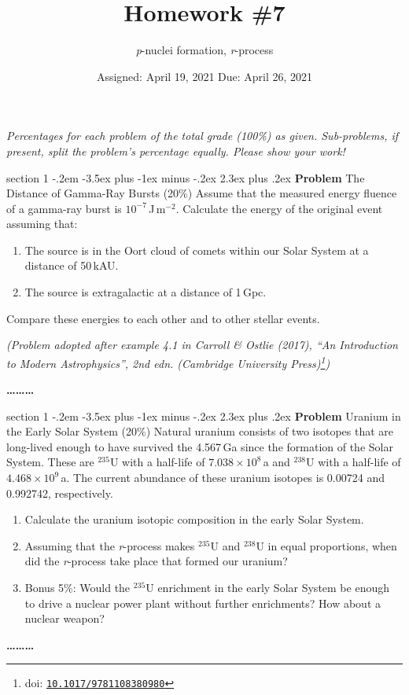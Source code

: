 \documentclass[letterpaper,12pt,twoside=false,DIV=11]{scrartcl}
\makeatletter
\newcommand{\topic}{\author}
\newenvironment{problem}{\@startsection
    {section}
    {1}
    {-.2em}
    {-3.5ex plus -1ex minus -.2ex}
    {2.3ex plus .2ex}
    {
        \pagebreak[3] %
        \noindent\sffamily\bfseries Problem
    }
}
{
    \begin{center}\large\bfseries\ldots\ldots\ldots\end{center}
}
\providecommand{\ex}[1]{\ensuremath{^{#1}}}
\makeatother
\begin{document}
\title{Homework \#7}
\topic{\textit{p}-nuclei formation, \textit{r}-process}
\date{Assigned: April 19, 2021 \qquad Due: April 26, 2021}

\maketitle
\thispagestyle{fancy}

\noindent\emph{Percentages for each problem of the total grade (100\%) as given. Sub-problems, if present, split the problem's percentage equally. Please show your work!}

\begin{problem}{The Distance of Gamma-Ray Bursts (20\%)}
Assume that the measured energy fluence of a gamma-ray burst is $10^{-7}$\,J\,m$^{-2}$. Calculate the energy of the original event assuming that:
\begin{enumerate}
    \item The source is in the Oort cloud of comets within our Solar System at a distance of 50\,kAU.
    \item The source is extragalactic at a distance of 1\,Gpc.
\end{enumerate}
Compare these energies to each other and to other stellar events. 

\noindent\emph{(Problem adopted after example 4.1 in Carroll \& Ostlie (2017), ``An Introduction to Modern Astrophysics'', 2nd edn. (Cambridge University Press)\footnote{doi: \href{http://doi.org/10.1017/9781108380980}{\texttt{10.1017/9781108380980}}})}

\end{problem}

\begin{problem}{Uranium in the Early Solar System (20\%)}
Natural uranium consists of two isotopes that are long-lived enough to have survived the 4.567\,Ga since the formation of the Solar System. These are \ex{235}U with a half-life of $7.038\times10^8$\,a and \ex{238}U with a half-life of $4.468\times10^{9}$\,a. The current abundance of these uranium isotopes is 0.00724 and 0.992742, respectively.

\begin{enumerate}
    \item Calculate the uranium isotopic composition in the early Solar System.
    \item Assuming that the \textit{r}-process makes \ex{235}U and \ex{238}U in equal proportions, when did the \textit{r}-process take place that formed our uranium?
    \item Bonus 5\%: Would the \ex{235}U enrichment in the early Solar System be enough to drive a nuclear power plant without further enrichments? How about a nuclear weapon?
\end{enumerate}
\end{problem}
\end{document}
